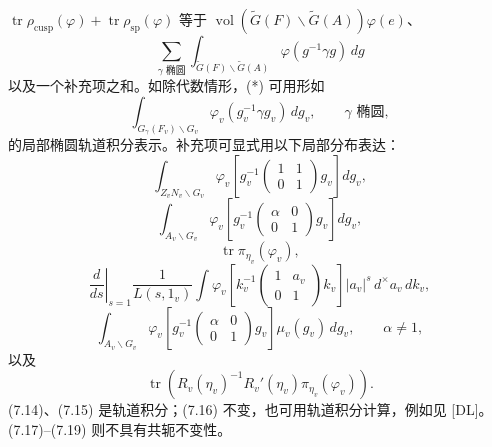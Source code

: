 $\operatorname{tr}\rho_{\mathrm{cusp}}(\varphi)+\operatorname{tr}\rho_{\mathrm{sp}}(\varphi)$ 等于
$\operatorname{vol}(\widetilde G(F)\backslash\widetilde G(A))\varphi(e)$、
\[
 \sum_{\gamma\text{ 椭圆}}\int_{\widetilde G(F)\backslash\widetilde G(A)}\varphi(g^{-1}\gamma g)\,dg
 \tag{*}
\]
以及一个补充项之和。如除代数情形，(*) 可用形如
\[
 \int_{G_\gamma(F_v)\backslash G_v}\varphi_v(g_v^{-1}\gamma g_v)\,dg_v,
 \qquad\gamma\text{ 椭圆},
\]
的局部椭圆轨道积分表示。补充项可显式用以下局部分布表达：
\begin{equation}
 \int_{Z_vN_v\backslash G_v}\varphi_v\!\left[g_v^{-1}\begin{pmatrix}1&1\\0&1\end{pmatrix}g_v\right]dg_v,\tag{7.14}
\end{equation}
\begin{equation}
 \int_{A_v\backslash G_v}\varphi_v\!\left[g_v^{-1}\begin{pmatrix}\alpha&0\\0&1\end{pmatrix}g_v\right]dg_v,\tag{7.15}
\end{equation}
\begin{equation}
 \operatorname{tr}\pi_{\eta_v}(\varphi_v),\tag{7.16}
\end{equation}
\begin{equation}
 \left.\frac d{ds}\right|_{s=1}\frac1{L(s,1_v)}
 \int\varphi_v\!\left[k_v^{-1}\begin{pmatrix}1&a_v\\0&1\end{pmatrix}k_v\right]
 |a_v|^s\,d^\times a_v\,dk_v,\tag{7.17}
\end{equation}
\begin{equation}
 \int_{A_v\backslash G_v}\varphi_v\!\left[g_v^{-1}\begin{pmatrix}\alpha&0\\0&1\end{pmatrix}g_v\right]
 \mu_v(g_v)\,dg_v,\qquad\alpha\ne1,\tag{7.18}
\end{equation}
以及
\begin{equation}
 \operatorname{tr}(R_v(\eta_v)^{-1}R_v'(\eta_v)\pi_{\eta_v}(\varphi_v)).\tag{7.19}
\end{equation}
(7.14)、(7.15) 是轨道积分；(7.16) 不变，也可用轨道积分计算，例如见 [DL]。
(7.17)--(7.19) 则不具有共轭不变性。

